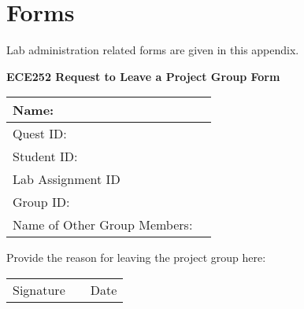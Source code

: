 \chapter{Forms}
Lab administration related forms are given in this appendix.
\newpage
\begin{center}
{\bf ECE252 Request to Leave a Project Group Form}
\end{center}

\begin{table*}[h]
    \begin{center}
          \begin{tabular}{|p{6cm}|p{6cm}|}
          \hline
          Name:             & \\ \hline
          Quest ID:         & \\ \hline
          Student ID:       & \\ \hline
          Lab Assignment ID & \\ \hline
          Group ID:         & \\ \hline
          Name of Other Group Members: & \\ \hline
          \end{tabular}
    \end{center}
\end{table*}

Provide the reason for leaving the project group here:

\vspace{9cm}

\begin{table*}
\begin{center}
\begin{tabular}{p{6cm} p{1cm} p{6cm}}
Signature && Date \\
\cline{1-1}
\cline{3-3}
\end{tabular}
\end{center}
\end{table*}
